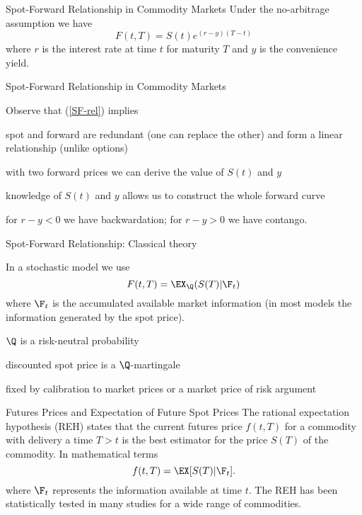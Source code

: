 {%
{Spot-Forward Relationship in Commodity Markets }
Under the no-arbitrage assumption we have
\begin{equation}\label{SF-rel}
F(t,T)=S(t)e^{(r-y)(T-t)}
\end{equation}
where $r$ is the interest rate at time $t$ for maturity $T$ and $y$ is the convenience yield.

{Spot-Forward Relationship in Commodity Markets }

Observe that (\ref{SF-rel}) implies






	spot and forward are redundant (one can replace the other) and form a
linear relationship (unlike options)


	with two forward prices we can derive the value of $S(t)$ and $y$


	knowledge of $S(t)$ and $y$ allows us to construct the whole forward curve


	for $r-y <0$ we have backwardation; for $r-y>0$ we have contango.





{Spot-Forward Relationship: Classical theory}






	In a stochastic model we use
$$
F(t,T)=\EX_{\Q}(S(T)|\F_t)
$$
where $\F_t$ is the accumulated available market information (in most models the information generated by the spot price).


	$\Q$ is a risk-neutral probability






	discounted spot price is a $\Q$-martingale


	fixed by calibration to market prices or a market price of risk argument









{Futures Prices and Expectation of Future Spot Prices}
The rational expectation hypothesis (REH) states that the current futures price $f(t,T)$ for a commodity with
delivery a time $T>t$ is the best estimator for the price $S(T)$ of the commodity.
In mathematical terms
\begin{equation}\label{REH}
f(t,T) = \EX[S(T) |\F_t].
\end{equation}
where $\F_t$ represents the information available at time $t$. The REH has been statistically
tested in many studies for a wide range of commodities.

}
